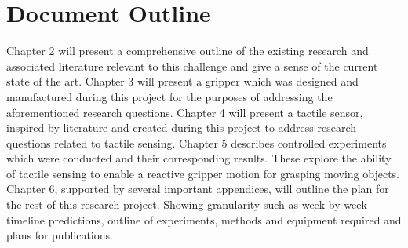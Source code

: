 \section{Document Outline}
Chapter 2 will present a comprehensive outline of the existing research and associated literature relevant to this challenge and give a sense of the current state of the art. Chapter 3 will present a gripper which was designed and manufactured during this project for the purposes of addressing the aforementioned research questions. Chapter 4 will present a tactile sensor, inspired by literature and created during this project to address research questions related to tactile sensing. Chapter 5 describes controlled experiments which were conducted and their corresponding results. These explore the ability of tactile sensing to enable a reactive gripper motion for grasping moving objects. Chapter 6, supported by several important appendices, will outline the plan for the rest of this research project. Showing granularity such as week by week timeline predictions, outline of experiments, methods and equipment required and plans for publications.



